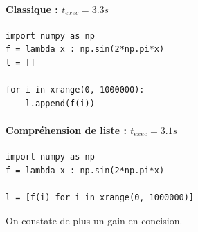 \begin{minipage}[t]{0.5\textwidth}
\paragraph{Classique  : $t_{exec} = 3.3s$}

\begin{verbatim}
import numpy as np
f = lambda x : np.sin(2*np.pi*x)
l = []

for i in xrange(0, 1000000):
    l.append(f(i))
\end{verbatim}
\end{minipage}
\begin{minipage}[t]{0.5\textwidth}
\paragraph{Compréhension de liste : $t_{exec} = 3.1s$}

\begin{verbatim}
import numpy as np
f = lambda x : np.sin(2*np.pi*x)

l = [f(i) for i in xrange(0, 1000000)]
\end{verbatim}
\end{minipage}

On constate de plus un gain en concision.

